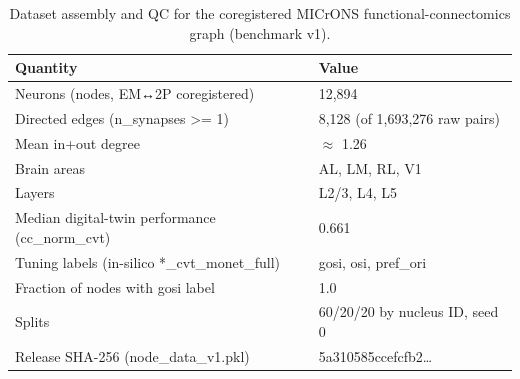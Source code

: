 \begin{table}[htbp]
  \centering
  \caption{Dataset assembly and QC for the coregistered MICrONS functional-connectomics graph (benchmark v1).}
  \label{tab:dataset}
  \begin{tabular}{ll}
    \toprule
    Quantity & Value \\
    \midrule
    Neurons (nodes, EM↔2P coregistered) & 12,894 \\
    Directed edges (n\_synapses >= 1) & 8,128 (of 1,693,276 raw pairs) \\
    Mean in+out degree & $\approx$ 1.26 \\
    Brain areas & AL, LM, RL, V1 \\
    Layers & L2/3, L4, L5 \\
    Median digital-twin performance (cc\_norm\_cvt) & 0.661 \\
    Tuning labels (in-silico *\_cvt\_monet\_full) & gosi, osi, pref\_ori \\
    Fraction of nodes with gosi label & 1.0 \\
    Splits & 60/20/20 by nucleus ID, seed 0 \\
    Release SHA-256 (node\_data\_v1.pkl) & 5a310585ccefcfb2… \\
    \bottomrule
  \end{tabular}
\end{table}
